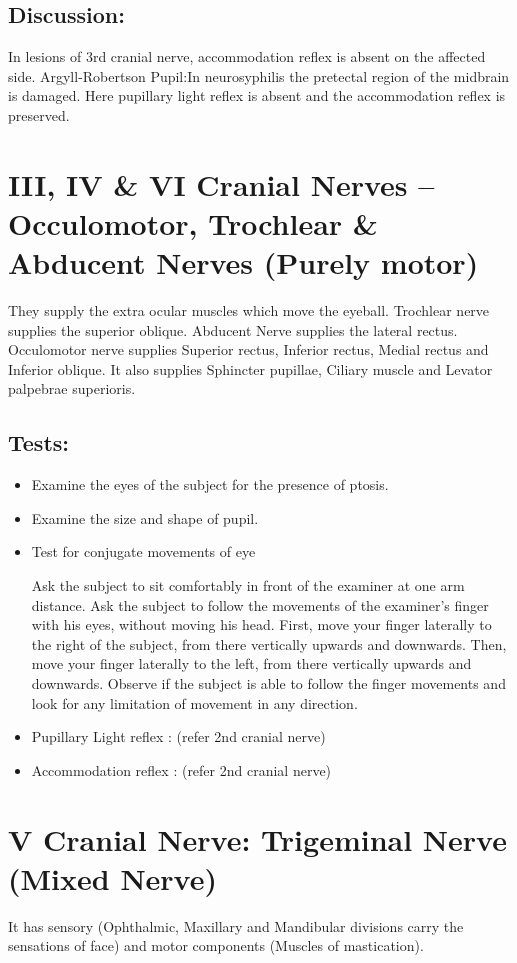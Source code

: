 \documentclass[a4paper,12pt,openany,oneside]{book}
\begin{document}
\subsection*{Discussion:}
	In lesions of 3rd cranial nerve, accommodation reflex is absent on the affected side. Argyll-Robertson Pupil:In neurosyphilis the pretectal region of the midbrain is damaged. Here pupillary light reflex is absent and the accommodation reflex is preserved.

\section*{III, IV \& VI Cranial Nerves –Occulomotor, Trochlear \& Abducent Nerves (Purely motor)}
They supply the extra ocular muscles which move the eyeball.  
Trochlear nerve supplies the superior oblique. 
Abducent Nerve supplies the lateral rectus.
Occulomotor nerve supplies Superior rectus, Inferior rectus, Medial rectus and Inferior oblique.
	It also supplies Sphincter pupillae, Ciliary muscle and Levator palpebrae superioris.
\subsection*{Tests:}
\begin{itemize}
\item{Examine the eyes of the subject for the presence of ptosis.}
\item{Examine the size and shape of pupil.}
\item{Test for conjugate movements of eye
	\par
	Ask the subject to sit comfortably in front of the examiner at one arm distance.  Ask the subject to follow the movements of the examiner's finger with his eyes, without moving his head. First, move your finger laterally to the right of the subject, from there vertically upwards and downwards.  Then, move your finger laterally to the left, from there vertically upwards and downwards.  Observe if the subject is able to follow the finger movements and look for any limitation of movement in any direction.}
\item{Pupillary Light reflex : (refer 2nd cranial nerve)}
\item{Accommodation reflex : (refer 2nd cranial nerve)}
\end{itemize}
\section*{V Cranial Nerve: Trigeminal Nerve (Mixed Nerve)}
	It has sensory (Ophthalmic, Maxillary and Mandibular divisions carry the sensations of face) and motor components (Muscles of mastication).
\end{document}
